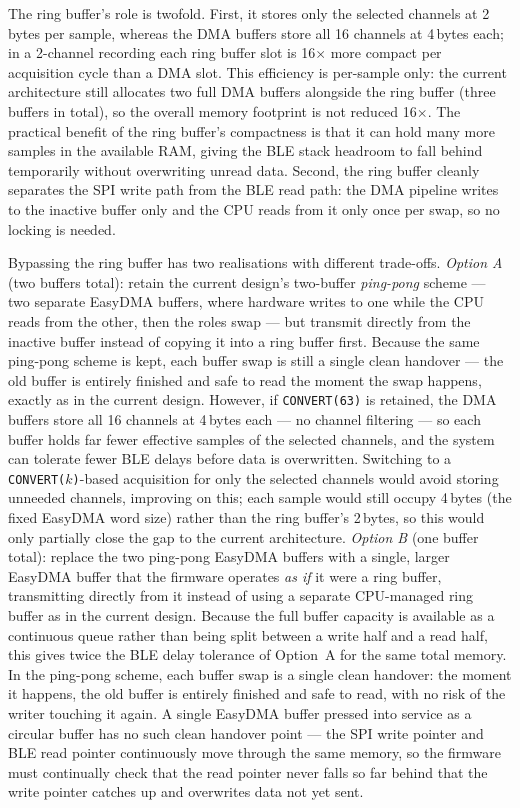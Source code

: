 The ring buffer's role is twofold. First, it stores only the selected channels at
2\,bytes per sample, whereas the DMA buffers store all 16 channels at 4\,bytes
each; in a 2-channel recording each ring buffer slot is 16$\times$ more compact
per acquisition cycle than a DMA slot. This efficiency is per-sample only: the
current architecture still allocates two full DMA buffers alongside the ring
buffer (three buffers in total), so the overall memory footprint is not reduced
16$\times$. The practical benefit of the ring buffer's compactness is that it
can hold many more samples in the available RAM, giving the BLE stack headroom
to fall behind temporarily without overwriting unread data. Second, the ring
buffer cleanly separates the SPI write path from the BLE read path: the DMA
pipeline writes to the inactive buffer only and the CPU reads from it only once
per swap, so no locking is needed.

Bypassing the ring buffer has two realisations with different trade-offs.
\emph{Option A} (two buffers total): retain the current design's two-buffer
\emph{ping-pong} scheme --- two separate EasyDMA buffers, where hardware writes
to one while the CPU reads from the other, then the roles swap --- but transmit
directly from the inactive buffer instead of copying it into a ring buffer first.
Because the same ping-pong scheme is kept, each buffer swap is still a single
clean handover --- the old buffer is entirely finished and safe to read the
moment the swap happens, exactly as in the current design. However, if
\texttt{CONVERT(63)} is retained, the DMA buffers store all
16 channels at 4\,bytes each --- no channel filtering --- so each buffer holds far
fewer effective samples of the selected channels, and the system can tolerate
fewer BLE delays before data is overwritten. Switching to a
\texttt{CONVERT($k$)}-based acquisition for only the selected channels would avoid
storing unneeded channels, improving on this; each sample would still occupy
4\,bytes (the fixed EasyDMA word size) rather than the ring buffer's 2\,bytes,
so this would only partially close the gap to the current architecture.
\emph{Option B} (one buffer total): replace the two ping-pong EasyDMA buffers with
a single, larger EasyDMA buffer that the firmware operates \emph{as if} it were a
ring buffer, transmitting directly from it instead of using a separate
CPU-managed ring buffer as in the current design. Because the full buffer
capacity is available as a continuous queue rather than being split between a
write half and a read half, this gives twice the BLE delay tolerance of Option~A
for the same total memory. In the ping-pong
scheme, each buffer swap is a single clean handover: the moment it happens, the
old buffer is entirely finished and safe to read, with no risk of the writer
touching it again. A single EasyDMA buffer pressed into service as a circular
buffer has no such clean handover point --- the SPI write pointer and BLE read
pointer continuously move through the same memory, so the firmware must
continually check that the read pointer never falls so far behind that the write
pointer catches up and overwrites data not yet sent.

